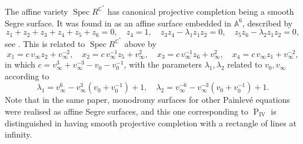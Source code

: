 \documentclass[a4paper,reqno]{amsart}
\numberwithin{equation}{section}
\newcommand{\C}{\mathbb{C}}
\newcommand{\pain}[1]{\operatorname{P}_{\mathrm{#1}}}
\DeclareMathOperator{\Spec}{Spec}
\numberwithin{equation}{section}
\begin{document}
The affine variety $\operatorname{Spec} R^{\C^*}$ has canonical projective completion being a smooth Segre surface. 
It was found in \cite{JMR} as an affine surface embedded in $\mathbb{A}^6$, described by
$$z_1+z_2+z_3+z_4+z_5+z_6=0,\quad z_4=1,\quad z_3 z_4 - \lambda_1 z_1 z_2 = 0,  \quad z_5 z_6 - \lambda_2 z_1z_2=0,$$
see \cite[Sec. 4.2.2]{JMR}. This is related to $\Spec R^{\C^*}$ above by 
$$x_1=  c\,  v_{\infty }z_2 +v_{\infty }^{-2}, \quad 
x_2 = c\, v_{\infty}^{-1}{z}_5+v_{\infty }^2, \quad
x_3 = c\, v_{\infty}^{-1} z_6 +v_{\infty }^2, \quad 
x_4 = c\, v_{\infty } z_1 + v_{\infty }^{-2},$$
in which $c = v_{\infty }^3+v_{\infty }^{-3}-v_0-v_0^{-1}$, with the parameters $\lambda_1,\lambda_2$ related to $v_0,v_{\infty}$ according to 
$$\lambda_1 =  v_{\infty }^6-v_{\infty }^3(v_0+v_0^{-1})+1,\quad \lambda_2 = v_{\infty }^{-6}-v_{\infty }^{-3} (v_0 + v_0^{-1})+1.$$
Note that in the same paper, monodromy surfaces for other Painlev\'e equations were realised as affine Segre surfaces, and this one corresponding to $\pain{IV}$ is distinguished in having smooth projective completion with a rectangle of lines at infinity.
\end{document}
